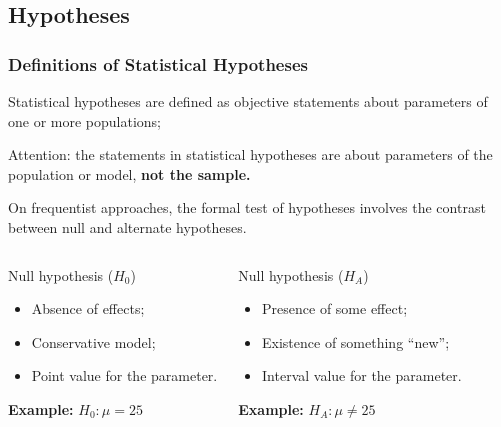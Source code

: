 \documentclass[10pt]{beamer}
\begin{document}
\subsection{Hypotheses}
\begin{frame}
  \frametitle{Definitions of Statistical Hypotheses} 
  Statistical hypotheses are defined as objective statements about
  parameters of one or more populations;

  \bigskip

  \alert{Attention:} the statements in statistical hypotheses are
  about parameters of the population or model, {\bf not the sample.}

  \bigskip

  On frequentist approaches, the formal test of hypotheses involves
  the contrast between null and alternate hypotheses.

  \begin{columns}
    \begin{block}{Null hypothesis ($H_0$)}
      \begin{itemize}
        \item Absence of effects;
        \item Conservative model;
        \item Point value for the parameter.
      \end{itemize}
      {\bf Example:} $H_0 : \mu = 25$
    \end{block}
    \begin{block}{Null hypothesis ($H_A$)}
      \begin{itemize}
        \item Presence of some effect;
        \item Existence of something ``new'';
        \item Interval value for the parameter.
      \end{itemize}
      {\bf Example:} $H_A : \mu \neq 25$
    \end{block}
  \end{columns}
\end{frame}
\end{document}
